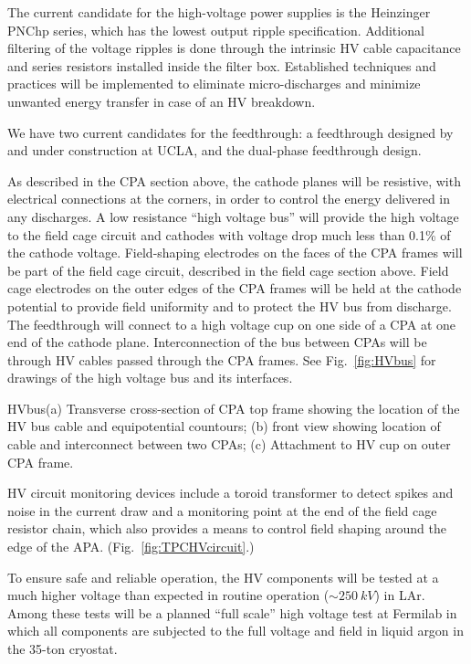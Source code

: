 The current candidate for the high-voltage power supplies is the
Heinzinger PNChp series, which has the lowest output ripple
specification. Additional filtering of the voltage ripples is done
through the intrinsic HV cable capacitance and series resistors
installed inside the filter box. Established techniques and practices
will be implemented to eliminate micro-discharges and minimize
unwanted energy transfer in case of an HV breakdown.

We have two current candidates for the feedthrough: a feedthrough
designed by and under construction at UCLA, and the dual-phase
feedthrough design.

As described in the CPA section above, the cathode planes will be
resistive, with electrical connections at the corners, in order to
control the energy delivered in any discharges.  A low resistance
``high voltage bus'' will provide the high voltage to the field cage
circuit and cathodes with voltage drop much less than 0.1\% of the
cathode voltage.  Field-shaping electrodes on the faces of the CPA
frames will be part of the field cage circuit, described in the field
cage section above. Field cage electrodes on the outer edges of the
CPA frames will be held at the cathode potential to provide field
uniformity and to protect the HV bus from discharge.  The feedthrough
will connect to a high voltage cup on one side of a CPA at one end of
the cathode plane.  Interconnection of the bus between CPAs will be
through HV cables passed through the CPA frames.  See
Fig.~\ref{fig:HVbus} for drawings of the high voltage bus and its
interfaces.

\begin{cdrfigure}{HVbus}{(a) Transverse cross-section of CPA top frame showing the location of the HV bus cable and equipotential countours; (b) front view showing location of cable and interconnect between two CPAs; (c) Attachment to HV cup on outer CPA frame.}
\end{cdrfigure}

HV circuit monitoring devices include a toroid transformer to detect
spikes and noise in the current draw and a monitoring point at the end
of the field cage resistor chain, which also provides a means to
control field shaping around the edge of the
APA. (Fig.\ \ref{fig:TPCHVcircuit}.)

To ensure safe and reliable operation, the HV components will be
tested at a much higher voltage than expected in routine operation
($\sim\SI{250}{kV}$) in LAr. Among these tests will be a planned
``full scale'' high voltage test at Fermilab in which all components
are subjected to the full voltage and field in liquid argon in the
35-ton cryostat.


